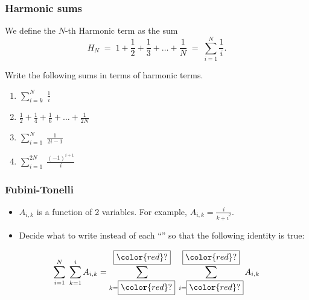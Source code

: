 \begin{frame}[t]
	\fontsize{13}{13}\selectfont
	\frametitle{Harmonic sums}

	We define the $N$-th Harmonic term as the sum
	\[
		H_{N}\; = \; 1 + \frac{1}{2}+ \frac{1}{3}+ \ldots + \frac{1}{N}\; = \; \sum_{i=1}
		^{N}\frac{1}{i}.
	\]

	Write the following sums in terms of harmonic terms.

	\begin{multicols}{2}
		\begin{enumerate}
			\item $\displaystyle \sum_{i=k}^{N}\; \frac{1}{i}$

			\item $\displaystyle \frac{1}{2}+ \frac{1}{4}+ \frac{1}{6}+ \ldots + \frac{1}{2N}$

			\item $\displaystyle \sum_{i=1}^{N}\; \frac{1}{2i-1}$

			\item $\displaystyle \sum_{i=1}^{2N}\; \frac{(-1)^{i+1}}{i}$
		\end{enumerate}
	\end{multicols}
\end{frame}

\begin{frame}[t]
	\fontsize{13}{13}\selectfont
	\frametitle{Fubini-Tonelli}

	\begin{itemize}
		\item $A_{i,k}$ is a function of 2 variables. \; For example, $\displaystyle
			A_{i,k}= \frac{i}{k+i^{2}}$.

		\item Decide what to write instead of each ``''
			so that the following identity is true:
	\end{itemize}

	{\fontsize{20}{20}\selectfont \begin{equation*}\sum_{i=1}^{N}\; \sum_{k=1}^{i}A_{i, k}= \sum_{k = \boxed{{\color{red} ?}}}^{\boxed{{\color{red} ?}}}\; \sum_{i=\boxed{{\color{red} ?}}}^{\boxed{{\color{red} ?}}}A_{i,k}\end{equation*} }
\end{frame}

